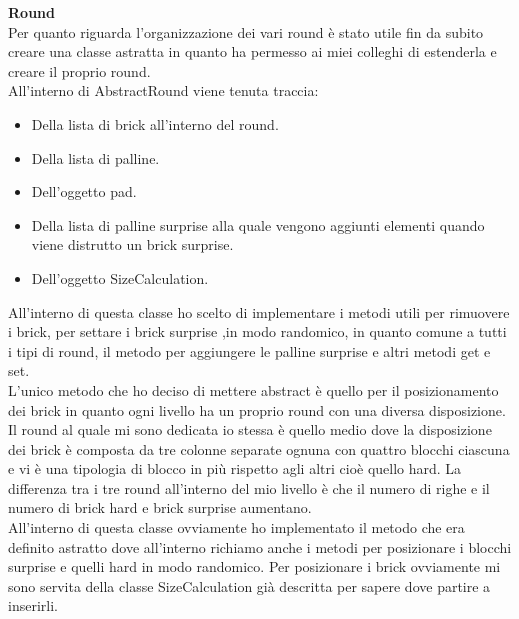 \documentclass[a4paper,12pt]{report}
\begin{document}
\textbf{Round}\\
Per quanto riguarda l'organizzazione dei vari round è stato utile fin da subito creare una classe astratta in quanto ha permesso ai miei colleghi di estenderla e creare il proprio round.
\\All'interno di AbstractRound viene tenuta traccia:
\begin{itemize}
    \item Della lista di brick all'interno del round.
    \item Della lista di palline.
    \item Dell'oggetto pad.
    \item Della lista di palline surprise alla quale vengono aggiunti elementi quando viene distrutto un brick surprise.
    \item Dell'oggetto SizeCalculation.
\end{itemize}
All'interno di questa classe ho scelto di implementare i metodi utili per rimuovere i brick, per settare i brick surprise ,in modo randomico, in quanto
comune a tutti i tipi di round, il metodo per aggiungere le palline surprise e altri metodi get e set.
\\L'unico metodo che ho deciso di mettere abstract è quello per il posizionamento dei brick in quanto ogni livello ha un proprio
round con una diversa disposizione.
\\Il round al quale mi sono dedicata io stessa è quello medio dove la disposizione dei brick è composta
da tre colonne separate ognuna con quattro blocchi ciascuna e vi è una tipologia di blocco in più rispetto agli altri cioè quello hard.
La differenza tra i tre round all'interno del mio livello è che il numero di righe e il numero di brick hard e brick surprise aumentano.
\\All'interno di questa classe ovviamente ho implementato il metodo che era definito astratto dove all'interno
richiamo anche i metodi per posizionare i blocchi surprise e quelli hard in modo randomico. Per posizionare i brick ovviamente mi sono servita
della classe SizeCalculation già descritta per sapere dove partire a inserirli.
\end{document}
